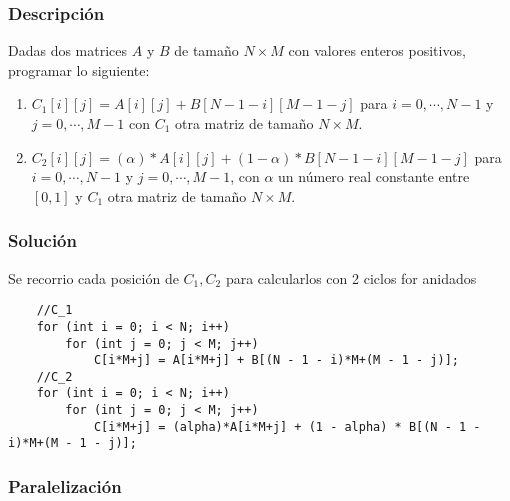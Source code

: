 \documentclass[letterpaper]{article}
\theoremstyle{definition}
\theoremstyle{lemathm}
\theoremstyle{lemathm}
\theoremstyle{lemathm}
\theoremstyle{lemademthm}
\newcommand{\1}{\mathbbm{1}}
\begin{document}
	\subsubsection*{Descripción}

	Dadas dos matrices $A$ y $B$ de tamaño $N\times M$ con valores enteros positivos, programar lo siguiente:

	\begin{enumerate}
		\item $C_1[i][j] = A[i][j] + B[N-1-i][M-1-j]$ para $i = 0,\cdots,N-1$ y $j = 0,\cdots,M-1$ con $C_1$ otra matriz de tamaño $N\times M$.
		\item $C_2[i][j] = (\alpha)*A[i][j] + (1-\alpha)*B[N-1-i][M-1-j]$ para $i = 0,\cdots,N-1$ y $j = 0,\cdots,M-1$, con $\alpha$ un número real constante entre $[0,1]$ y $C_1$ otra matriz de tamaño $N\times M$.
	\end{enumerate}

	\subsubsection*{Solución}

	Se recorrio cada posición de $C_1,C_2$ para calcularlos con 2 ciclos for anidados
	
	\begin{verbatim}
	//C_1
	for (int i = 0; i < N; i++)
        for (int j = 0; j < M; j++)
            C[i*M+j] = A[i*M+j] + B[(N - 1 - i)*M+(M - 1 - j)];
	//C_2
	for (int i = 0; i < N; i++)
        for (int j = 0; j < M; j++)
            C[i*M+j] = (alpha)*A[i*M+j] + (1 - alpha) * B[(N - 1 - i)*M+(M - 1 - j)];
	\end{verbatim}

	\subsubsection*{Paralelización}
\end{document}
